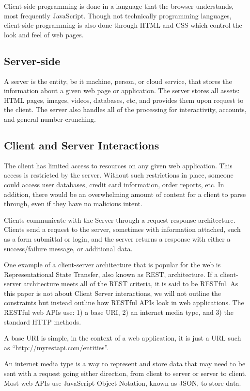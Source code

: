 \documentclass[12pt]{ucthesis}
\begin{document}
Client-side programming is done in a language that the browser understands, most frequently JavaScript. Though not technically programming languages, client-side programming is also done through HTML and CSS which control the look and feel of web pages.

\subsection{Server-side}
A server is the entity, be it machine, person, or cloud service, that stores the information about a given web page or application. The server stores all assets: HTML pages, images, videos, databases, etc, and provides them upon request to the client. The server also handles all of the processing for interactivity, accounts, and general number-crunching.

\subsection{Client and Server Interactions}
The client has limited access to resources on any given web application. This access is restricted by the server. Without such restrictions in place, someone could access user databases, credit card information, order reports, etc. In addition, there would be an overwhelming amount of content for a client to parse through, even if they have no malicious intent.

Clients communicate with the Server through a request-response architecture. Clients send a request to the server, sometimes with information attached, such as a form submittal or login, and the server returns a response with either a success/failure message, or additional data.

One example of a client-server architecture that is popular for the web is Representational State Transfer, also known as REST, architecture. If a client-server architecture meets all of the REST criteria, it is said to be RESTful. As this paper is not about Client Server interactions, we will not outline the constraints but instead outline how RESTful APIs look in web applications. The RESTful web APIs use: 1) a base URI, 2) an internet media type, and 3) the standard HTTP methods.

A base URI is simple, in the context of a web application, it is just a URL such as ``http://myrestapi.com/entities''.

An internet media type is a way to represent and store data that may need to be sent with a request going either direction, from client to server or server to client. Most web APIs use JavaScript Object Notation, known as JSON, to store data.
\end{document}
